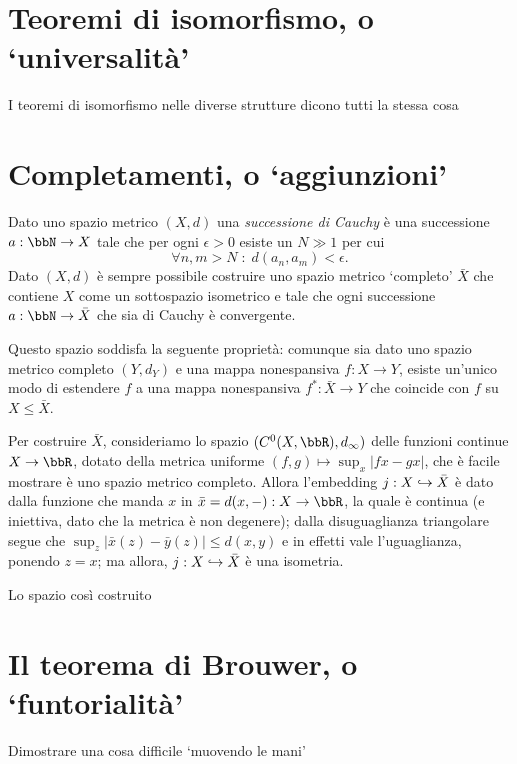 \section*{Teoremi di isomorfismo, o `universalità'}
I teoremi di isomorfismo nelle diverse strutture dicono tutti la stessa cosa
\section*{Completamenti, o `aggiunzioni'}
Dato uno spazio metrico \((X,d)\) una \emph{successione di Cauchy} è una successione \(a : \bbN \to X\) tale che per ogni \(\epsilon>0\) esiste un \(N\gg 1\) per cui
\[\forall n,m> N\; : \; d(a_n,a_m) < \epsilon.\]
Dato \((X,d)\) è sempre possibile costruire uno spazio metrico `completo' \(\bar X\) che contiene \(X\) come un sottospazio isometrico e tale che ogni successione \(a : \bbN \to \bar X\) che sia di Cauchy è convergente.

Questo spazio soddisfa la seguente proprietà: comunque sia dato uno spazio metrico completo \((Y,d_Y)\) e una mappa nonespansiva \(f : X\to Y\), esiste un'unico modo di estendere \(f\) a una mappa nonespansiva \(f^* : \bar X \to Y\) che coincide con \(f\) su \(X\le \bar X\).

Per costruire \(\bar X\), consideriamo lo spazio \((C^0(X,\bbR),d_\infty)\) delle funzioni continue \(X\to\bbR\), dotato della metrica uniforme \((f,g)\mapsto \sup_x |fx-gx|\), che è facile mostrare è uno spazio metrico completo. Allora l'embedding \(j : X\hookrightarrow \bar X\) è dato dalla funzione che manda \(x\) in \(\bar x = d(x,-) : X\to \bbR\), la quale è continua (e iniettiva, dato che la metrica è non degenere); dalla disuguaglianza triangolare segue che \(\sup_z|\bar{x}(z)-\bar{y}(z)|\le d(x,y)\) e in effetti vale l'uguaglianza, ponendo \(z=x\); ma allora, \(j : X\hookrightarrow \bar X\) è una isometria.

Lo spazio così costruito
\section*{Il teorema di Brouwer, o `funtorialità'}
Dimostrare una cosa difficile `muovendo le mani'

